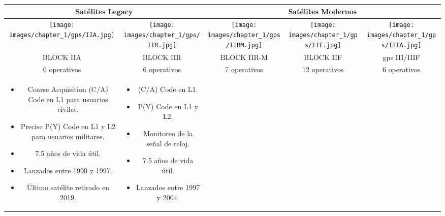 \begin{table}[H]
    \centering
    \renewcommand{\arraystretch}{1.5}
    \setlength{\tabcolsep}{5pt}
    \begin{tabular}{|c|c|c|c|c|}
        \hline
        \multicolumn{2}{|c|}{Satélites Legacy} &
        \multicolumn{3}{|c|}{Satélites Modernos} \\
        \hline
        \texttt{[image: images/chapter\_1/gps/IIA.jpg]} &
        \texttt{[image: images/chapter\_1/gps/IIR.jpg]} &
        \texttt{[image: images/chapter\_1/gps/IIRM.jpg]} &
        \texttt{[image: images/chapter\_1/gps/IIF.jpg]} &
        \texttt{[image: images/chapter\_1/gps/IIIA.jpg]} \\
        \hline
        BLOCK IIA & BLOCK IIR & BLOCK IIR-M & BLOCK IIF & \gls{gps} III/IIIF \\
        \hline
        \cellcolor{darkgray}0 operativos & \cellcolor{fluorescentgreen}6 operativos & \cellcolor{fluorescentgreen}7 operativos & \cellcolor{fluorescentgreen}12 operativos & \cellcolor{fluorescentgreen}6 operativos \\
        \hline
        \parbox[t]{2.5cm}{
            {\fontsize{9}{11}\selectfont
                \begin{itemize}[leftmargin=*]
                    \item Coarse Acquisition (C/A) Code en L1 para usuarios civiles.
                    \item Precise P(Y) Code en L1 y L2 para usuarios militares.
                    \item 7.5 años de vida útil.
                    \item Lanzados entre 1990 y 1997.
                    \item Último satélite retirado en 2019.
                \end{itemize}
            }
        } &
        \parbox[t]{2.5cm}{
            {\fontsize{9}{11}\selectfont
                \begin{itemize}[leftmargin=*]
                    \item (C/A) Code en L1.
                    \item P(Y) Code en L1 y L2.
                    \item Monitoreo de la señal de reloj.
                    \item 7.5 años de vida útil.
                    \item Lanzados entre 1997 y 2004.
                \end{itemize}
}}
\end{tabular}
\end{table}
